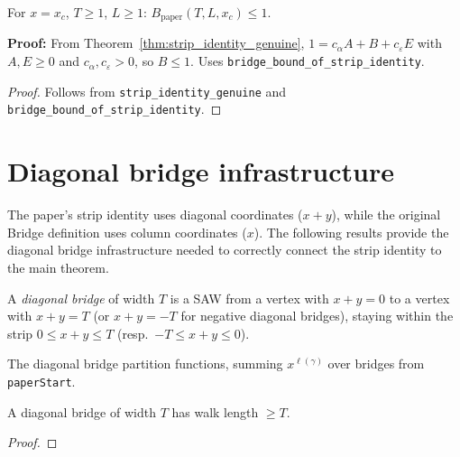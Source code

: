 \begin{theorem}\label{thm:B_paper_le_one_direct}
\leanok
{}
  For $x = x_c$, $T \geq 1$, $L \geq 1$:
  $B_{\text{paper}}(T, L, x_c) \leq 1$.

  \textbf{Proof:} From Theorem~\ref{thm:strip_identity_genuine},
  $1 = c_{\alpha} A + B + c_{\varepsilon} E$ with $A, E \geq 0$
  and $c_{\alpha}, c_{\varepsilon} > 0$, so $B \leq 1$.
  Uses \texttt{bridge\_bound\_of\_strip\_identity}.
\end{theorem}
\begin{proof}
\leanok
{}
  Follows from \texttt{strip\_identity\_genuine} and
  \texttt{bridge\_bound\_of\_strip\_identity}.
\end{proof}

\section{Diagonal bridge infrastructure}

The paper's strip identity uses diagonal coordinates ($x+y$), while the
original Bridge definition uses column coordinates ($x$). The following
results provide the diagonal bridge infrastructure needed to correctly
connect the strip identity to the main theorem.

\begin{definition}\label{def:diag_bridge}
\leanok
{}
  A \emph{diagonal bridge} of width $T$ is a SAW from a vertex with
  $x+y = 0$ to a vertex with $x+y = T$ (or $x+y = -T$ for negative
  diagonal bridges), staying within the strip $0 \leq x+y \leq T$
  (resp.\ $-T \leq x+y \leq 0$).
\end{definition}

\begin{definition}\label{def:diag_partition}
\leanok
{}
  The diagonal bridge partition functions, summing $x^{\ell(\gamma)}$
  over bridges from \texttt{paperStart}.
\end{definition}

\begin{lemma}\label{lem:diag_bridge_length}
\leanok
{}
  A diagonal bridge of width $T$ has walk length $\geq T$.
\end{lemma}
\begin{proof}
\leanok
\end{proof}

